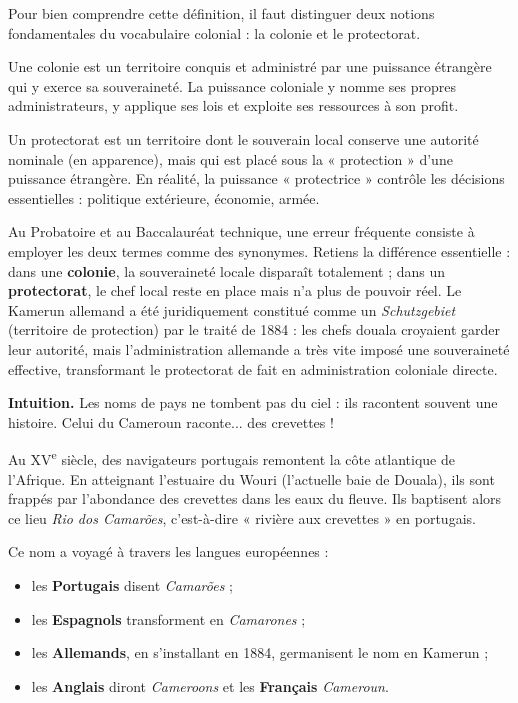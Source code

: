\documentclass[11pt]{article}
\newcommand{\cle}[1]{{\popxbold\color{popdark}#1}}
\newcounter{popsec}
\newcounter{popsub}
\newcommand{\courssub}[1]{%
  \stepcounter{popsub}%
  \par\vspace{9pt}\noindent{\popxbold\fontsize{11.5}{13}\selectfont\color{popink}{\color{poporange}\thepopsec.\thepopsub}\hspace{6pt}#1}\par\nopagebreak\vspace{4pt}
}
\begin{document}
Pour bien comprendre cette définition, il faut distinguer deux notions fondamentales du vocabulaire colonial : la colonie et le protectorat.

\begin{definition}[Colonie]
Une \cle{colonie} est un territoire conquis et administré par une puissance étrangère qui y exerce sa souveraineté. La puissance coloniale y nomme ses propres administrateurs, y applique ses lois et exploite ses ressources à son profit.
\end{definition}

\begin{definition}[Protectorat]
Un \cle{protectorat} est un territoire dont le souverain local conserve une autorité nominale (en apparence), mais qui est placé sous la « protection » d'une puissance étrangère. En réalité, la puissance « protectrice » contrôle les décisions essentielles : politique extérieure, économie, armée.
\end{definition}

\begin{attention}
Au Probatoire et au Baccalauréat technique, une erreur fréquente consiste à employer les deux termes comme des synonymes. Retiens la différence essentielle : dans une \textbf{colonie}, la souveraineté locale disparaît totalement ; dans un \textbf{protectorat}, le chef local reste en place mais n'a plus de pouvoir réel. Le Kamerun allemand a été juridiquement constitué comme un \emph{Schutzgebiet} (territoire de protection) par le traité de 1884 : les chefs douala croyaient garder leur autorité, mais l'administration allemande a très vite imposé une souveraineté effective, transformant le protectorat de fait en administration coloniale directe.
\end{attention}

\courssub{D'où vient le nom « Kamerun » ?}

\textbf{Intuition.} Les noms de pays ne tombent pas du ciel : ils racontent souvent une histoire. Celui du Cameroun raconte... des crevettes !

Au XV\textsuperscript{e} siècle, des navigateurs portugais remontent la côte atlantique de l'Afrique. En atteignant l'estuaire du Wouri (l'actuelle baie de Douala), ils sont frappés par l'abondance des crevettes dans les eaux du fleuve. Ils baptisent alors ce lieu \emph{Rio dos Camarões}, c'est-à-dire « rivière aux crevettes » en portugais.

Ce nom a voyagé à travers les langues européennes :
\begin{itemize}
\item les \textbf{Portugais} disent \emph{Camarões} ;
\item les \textbf{Espagnols} transforment en \emph{Camarones} ;
\item les \textbf{Allemands}, en s'installant en 1884, germanisent le nom en \cle{Kamerun} ;
\item les \textbf{Anglais} diront \emph{Cameroons} et les \textbf{Français} \emph{Cameroun}.
\end{itemize}
\end{document}
